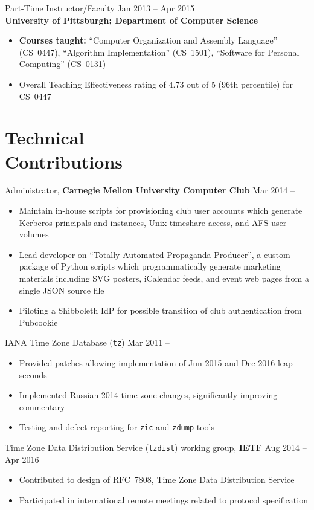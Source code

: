 \documentclass[11pt]{article}
\newcommand{\textdb}[1]{\fontseries{db}\selectfont#1\normalfont}
\newcommand{\present}{\phantom{Xxx 20XX}}
\begin{document}
\textdb{
Part-Time Instructor/Faculty
	\hfill Jan 2013 -- Apr 2015 \\
}
\textbf{University of Pittsburgh; Department of Computer Science}
\begin{itemize}
	\item \textbf{Courses taught:}
		``Computer Organization and Assembly Language'' (CS~0447),
		``Algorithm Implementation'' (CS~1501),
		``Software for Personal Computing'' (CS~0131)
	\item Overall Teaching Effectiveness rating of 4.73 out of 5
		(96th percentile) for CS~0447
\end{itemize}



\section{Technical\\ Contributions}

\textdb{
Administrator,
\textbf{Carnegie Mellon University Computer Club}
	\hfill Mar 2014 -- \present
}
\begin{itemize}
	\item Maintain in-house scripts for provisioning club user accounts
		which generate Kerberos principals and instances,
		Unix timeshare access, and AFS user volumes
	\item Lead developer on ``Totally Automated Propaganda Producer'',
		a custom package of Python scripts
		which programmatically generate marketing materials
		including SVG posters, iCalendar feeds, and event web pages
		from a single JSON source file
	\item Piloting a Shibboleth IdP for possible transition
		of club authentication from Pubcookie
\end{itemize}

\textdb{
IANA Time Zone Database (\texttt{tz})
	\hfill Mar 2011 -- \present
}
\begin{itemize}
	\item Provided patches allowing implementation of Jun 2015 and Dec 2016 leap seconds
	\item Implemented Russian 2014 time zone changes,
		significantly improving commentary
	\item Testing and defect reporting for \texttt{zic} and \texttt{zdump} tools
\end{itemize}

\textdb{
Time Zone Data Distribution Service (\texttt{tzdist}) working group,
\textbf{IETF}
	\hfill Aug 2014 -- Apr 2016
}
\begin{itemize}
	\item Contributed to design of RFC~7808, Time Zone Data Distribution Service
	\item Participated in international remote meetings related to protocol specification
\end{itemize}
\end{document}
